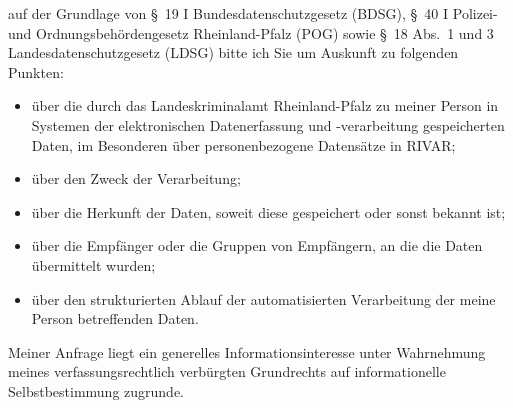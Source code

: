 auf der Grundlage von §~19 I Bundesdatenschutzgesetz (BDSG),
§~40 I Polizei- und Ordnungsbehördengesetz Rheinland-Pfalz (POG) sowie
§~18 Abs.~1 und 3 Landesdatenschutzgesetz (LDSG) bitte ich Sie um Auskunft zu
folgenden Punkten:

\begin{itemize}
  \item über die durch das Landeskriminalamt Rheinland-Pfalz zu meiner Person in
  Systemen der elektronischen Datenerfassung und -verarbeitung gespeicherten Daten,
  im Besonderen über personenbezogene Datensätze in RIVAR;

  \item über den Zweck der Verarbeitung;

  \item über die Herkunft der Daten, soweit diese gespeichert oder sonst bekannt ist;

  \item über die Empfänger oder die Gruppen von Empfängern, an die die Daten übermittelt wurden;

  \item über den strukturierten Ablauf der automatisierten Verarbeitung der meine
  Person betreffenden Daten.
\end{itemize}

Meiner Anfrage liegt ein generelles Informationsinteresse unter Wahrnehmung
meines verfassungsrechtlich verbürgten Grundrechts auf informationelle
Selbstbestimmung zugrunde.
